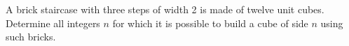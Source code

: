 A brick staircase with three steps of width 2 is made of twelve unit cubes. Determine all integers $n$ for which it is possible to build a cube of side $n$ using such bricks.

